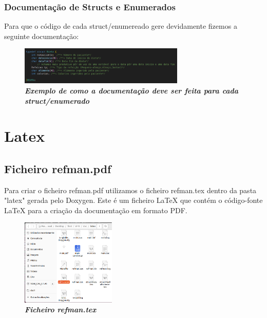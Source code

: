 \documentclass[a4wide]{report}
\begin{document}
{{{{\subsection{Documentação de Structs e Enumerados}
\Large
Para que o código de cada struct/enumereado gere devidamente fizemos a seguinte documentação:
\begin{figure}[hbt]
    \centering
    \includegraphics[width=0.70\textwidth]{imagem_14.png}
    \caption{\textbf{\textit{Exemplo de como a documentação deve ser feita para cada struct/enumerado}} \label{fig:imagem}}
\end{figure}








\chapter{Latex}
\section{Ficheiro refman.pdf}
\Large
Para criar o ficheiro refman.pdf utilizamos o ficheiro refman.tex dentro da pasta "latex" gerada pelo Doxygen. Este é um ficheiro  LaTeX que contém o código-fonte LaTeX para a criação da documentação em formato PDF. 
\begin{figure}[hbt]
    \centering
    \includegraphics[width=0.40\textwidth]{imagem_15.png}
    \caption{\textbf{\textit{Ficheiro refman.tex}}\label{fig:imagem}}
\end{figure}

}}}}
\end{document}
